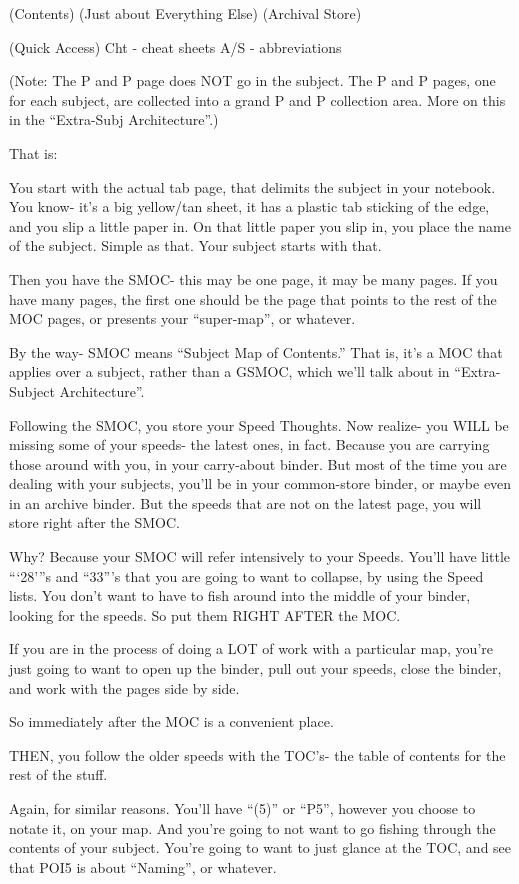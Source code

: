 \documentclass[oneside]{book}
\begin{document}
  (Contents)
(Just about Everything Else)
(Archival Store)

  (Quick Access)
Cht     - cheat sheets
A/S     - abbreviations

(Note: The P and P page does NOT go in the subject. The P and P pages, one for
each subject, are collected into a grand P and P collection area. More on
this in the ``Extra-Subj Architecture''.)

That is:

You start with the actual tab page, that delimits the subject in your
notebook. You know- it's a big yellow/tan sheet, it has a plastic tab
sticking of the edge, and you slip a little paper in. On that little
paper you slip in, you place the name of the subject. Simple as
that. Your subject starts with that.

Then you have the SMOC- this may be one page, it may be many pages. If
you have many pages, the first one should be the page that points to
the rest of the MOC pages, or presents your ``super-map'', or whatever.

By the way- SMOC means ``Subject Map of Contents.'' That is, it's a MOC
that applies over a subject, rather than a GSMOC, which we'll talk
about in ``Extra-Subject Architecture''.

Following the SMOC, you store your Speed Thoughts. Now realize- you
WILL be missing some of your speeds- the latest ones, in fact. Because
you are carrying those around with you, in your carry-about
binder. But most of the time you are dealing with your subjects,
you'll be in your common-store binder, or maybe even in an archive
binder. But the speeds that are not on the latest page, you will store
right after the SMOC.

Why? Because your SMOC will refer intensively to your Speeds. You'll
have little ```28'''s and ``33'''s that you are going to want to collapse,
by using the Speed lists. You don't want to have to fish around into
the middle of your binder, looking for the speeds. So put them RIGHT
AFTER the MOC.

If you are in the process of doing a LOT of work with a particular
map, you're just going to want to open up the binder, pull out your
speeds, close the binder, and work with the pages side by side.

So immediately after the MOC is a convenient place.

THEN, you follow the older speeds with the TOC's- the table of
contents for the rest of the stuff.

Again, for similar reasons. You'll have ``(5)'' or ``P5'', however you
choose to notate it, on your map. And you're going to not want to go
fishing through the contents of your subject. You're going to want to
just glance at the TOC, and see that POI5 is about ``Naming'', or
whatever.
\end{document}
